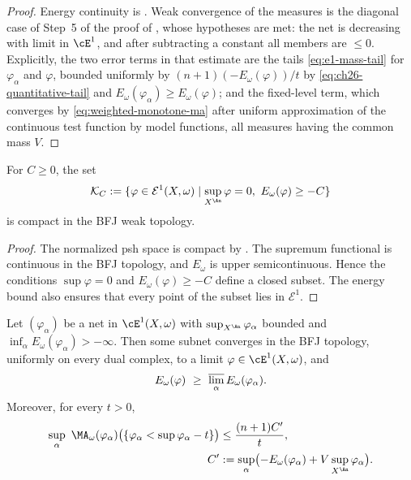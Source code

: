 \begin{proof}
Energy continuity is .  Weak convergence of
the measures is the diagonal case of Step~5 of the proof of
, whose hypotheses are met: the net is decreasing
with limit in \(\cE^1\), and after subtracting a constant all members are
\(\leq0\).  Explicitly, the two error terms in that estimate are the tails
\eqref{eq:e1-mass-tail} for \(\varphi_\alpha\) and \(\varphi\), bounded
uniformly by \((n+1)(-E_\omega(\varphi))/t\) by
\eqref{eq:ch26-quantitative-tail} and \(E_\omega(\varphi_\alpha)\geq
E_\omega(\varphi)\); and the fixed-level term, which converges by
\eqref{eq:weighted-monotone-ma} after uniform approximation of the continuous
test function by model functions, all measures having the common mass \(V\).
\end{proof}

\begin{proposition}\label{prop:e1-compact-superlevels}
For \(C\geq0\), the set
\begin{equation}
\label{eq:normalized-energy-superlevel}
 \mathcal K_C:=
 \{\varphi\in\mathcal E^1(X,\omega)\mid
   \sup_{X^{\An}}\varphi=0,\ E_\omega(\varphi)\geq-C\}
\end{equation}
is compact in the BFJ weak topology.
\end{proposition}

\begin{proof}
The normalized psh space is compact by
. The supremum functional is continuous
in the BFJ topology, and \(E_\omega\) is upper semicontinuous. Hence the
conditions \(\sup\varphi=0\) and \(E_\omega(\varphi)\geq-C\) define a closed
subset. The energy bound also ensures that every point of the subset lies in
\(\mathcal E^1\).
\end{proof}

\begin{corollary}
\label{cor:ch26-net-superlevel}
Let \((\varphi_\alpha)\) be a net in \(\cE^1(X,\omega)\) with
\(\sup_{X^{\An}}\varphi_\alpha\) bounded and
\(\inf_\alpha E_\omega(\varphi_\alpha)>-\infty\).  Then some subnet converges
in the BFJ topology, uniformly on every dual complex, to a limit
\(\varphi\in\cE^1(X,\omega)\), and
\begin{equation}
\label{eq:ch26-net-energy-usc}
 E_\omega(\varphi)\ \geq\
 \varlimsup_\alpha E_\omega(\varphi_\alpha).
\end{equation}
Moreover, for every \(t>0\),
\begin{equation}
\label{eq:ch26-uniform-tail-family}
 \begin{aligned}
 \sup_\alpha\ \MA_\omega(\varphi_\alpha)
   \bigl(\{\varphi_\alpha<\sup\varphi_\alpha-t\}\bigr)
 &\leq \frac{(n+1)C'}{t},\\
 C'&:=\sup_\alpha\bigl(-E_\omega(\varphi_\alpha)
   +V\sup_{X^{\An}}\varphi_\alpha\bigr).
 \end{aligned}
\end{equation}
\end{corollary}

